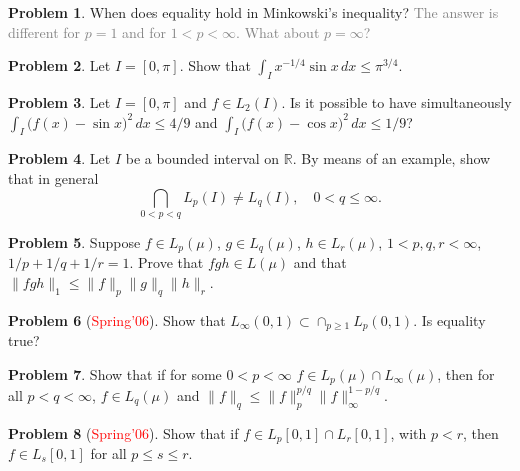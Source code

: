 \documentclass[12pt,reqno]{amsart}
\def\field#1{\mathbb{#1}}
\def\Lpnorm#1#2{\lVert {#1} \rVert_{#2}}
\theoremstyle{definition}
\newtheorem{problem}{Problem}
\theoremstyle{remark}
\begin{document}
\begin{problem}
  When does equality hold in Minkowski's inequality?
  \textcolor{gray}{The answer is different for $p=1$ and for
    $1<p<\infty$. What about $p=\infty$?}
\end{problem}
\begin{problem}
  Let $I = [0,\pi]$.  Show that $\int_I x^{-1/4} \sin x\, dx \leq
  \pi^{3/4}$.
\end{problem}
\begin{problem}
  Let $I=[0,\pi]$ and $f \in L_2(I)$.  Is it possible to have
  simultaneously $\int_I \big( f(x) -\sin x\big)^2\, dx \leq 4/9$ and
  $\int_I \big( f(x) - \cos x \big)^2\, dx \leq 1/9$?
\end{problem}

\begin{problem}
  Let $I$ be a bounded interval on $\field{R}$.  By means of an
  example, show that in general
  \begin{equation*}
    \bigcap_{0<p<q} L_p(I) \neq L_q(I),\quad 0<q\leq\infty.
  \end{equation*}
\end{problem}
\begin{problem}
  Suppose $f \in L_p(\mu)$, $g \in L_q(\mu)$, $h \in L_r(\mu)$,
  $1<p,q,r<\infty$, $1/p + 1/q +1/r =1$.  Prove that $fgh \in L(\mu)$
  and that $\Lpnorm{fgh}{1} \leq \Lpnorm{f}{p} \Lpnorm{g}{q}
  \Lpnorm{h}{r}$.
\end{problem}
\begin{problem}[\textcolor{red}{Spring'06}]
  Show that $L_\infty (0,1) \subset \displaystyle{\cap_{p \geq 1}}
  L_p(0,1)$.  Is equality true?
\end{problem}
\begin{problem}
  Show that if for some $0<p<\infty$ $f \in L_p(\mu) \cap
  L_{\infty}(\mu)$, then for all $p < q < \infty$, $f \in L_q(\mu)$
  and $\Lpnorm{f}{q} \leq \Lpnorm{f}{p}^{p/q}
  \Lpnorm{f}{\infty}^{1-p/q}$.
\end{problem}
\begin{problem}[\textcolor{red}{Spring'06}]
  Show that if $f \in L_p[0,1] \cap L_r[0,1]$, with $p<r$, then $f \in
  L_s[0,1]$ for all $p \leq s \leq r$.
\end{problem}
\end{document}
